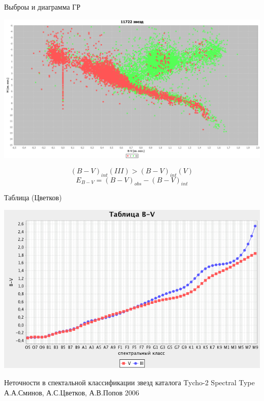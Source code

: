 \documentclass[14pt, fleqn, xcolor={dvipsnames, table}]{beamer}
\begin{document}
		\begin{frame}{Выброы и диаграмма ГР}
            \begin{center}
                \includegraphics[scale=0.2]{outlier-hr.png}
            \end{center}    
            $$(B - V)_{int}(III)  > (B - V)_{int}(V)$$
            $$E_{B - V} = (B - V)_{obs} - (B - V)_{int}$$        
        \end{frame}         
        
        \begin{frame}{Таблица (Цветков)}
            \begin{center}
                \includegraphics[scale=0.45]{table-tsvetkov.png}
            \end{center} 
            \tiny{Неточности в спектальной классификации звезд каталога Tycho-2 Spectral Type
А.А.Сминов, А.С.Цветков, А.В.Попов
2006}
        \end{frame} 
        
\end{document}
